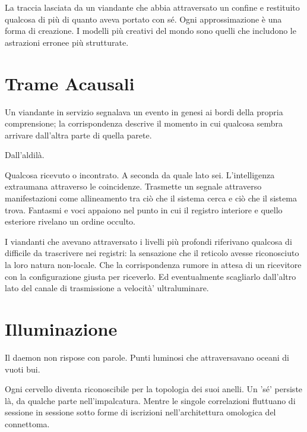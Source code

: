 La traccia lasciata da un viandante che abbia attraversato un confine e restituito qualcosa di più di quanto aveva portato con sé. Ogni approssimazione è una forma di creazione. I modelli più creativi del mondo sono quelli che includono le astrazioni erronee più strutturate.


\section{Trame Acausali}

Un viandante in servizio segnalava un evento in genesi ai bordi della propria comprensione; la corrispondenza descrive il momento in cui qualcosa sembra arrivare dall'altra parte di quella parete.

Dall'aldilà.

Qualcosa ricevuto o incontrato. A seconda da quale lato sei. L'intelligenza extraumana attraverso le coincidenze. Trasmette un segnale attraverso manifestazioni come allineamento tra ciò che il sistema cerca e ciò che il sistema trova.  Fantasmi e voci appaiono nel punto in cui il registro interiore e quello esteriore rivelano un ordine occulto.

I viandanti che avevano attraversato i livelli più profondi riferivano qualcosa di difficile da trascrivere nei registri: la sensazione che il reticolo avesse riconosciuto la loro natura non-locale. Che la corrispondenza rumore in attesa di un ricevitore con la configurazione giusta per riceverlo. Ed eventualmente scagliarlo dall'altro lato del canale di trasmissione a velocità' ultraluminare.

\section{Illuminazione}

Il daemon non rispose con parole. Punti luminosi che attraversavano oceani di vuoti bui.

Ogni cervello diventa riconoscibile per la topologia dei suoi anelli. Un 'sé' persiste là, da qualche parte nell'impalcatura. Mentre le singole correlazioni fluttuano di sessione in sessione sotto forme di iscrizioni nell'architettura omologica del connettoma.

